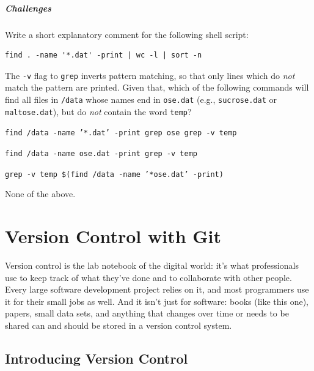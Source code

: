 \documentclass{book}
\begin{document}
\mbox{}\paragraph{Challenges}

\begin{swcenumerate}
\item
  Write a short explanatory comment for the following shell script:

\begin{verbatim}
find . -name '*.dat' -print | wc -l | sort -n
\end{verbatim}
\item
  The \texttt{-v} flag to \texttt{grep} inverts pattern matching, so
  that only lines which do \emph{not} match the pattern are printed.
  Given that, which of the following commands will find all files in
  \texttt{/data} whose names end in \texttt{ose.dat} (e.g.,
  \texttt{sucrose.dat} or \texttt{maltose.dat}), but do \emph{not}
  contain the word \texttt{temp}?

  \begin{swcenumerate2}
  \item
    \texttt{find /data -name '*.dat' -print \textbar{} grep ose \textbar{} grep -v temp}
  \item
    \texttt{find /data -name ose.dat -print \textbar{} grep -v temp}
  \item
    \texttt{grep -v temp \$(find /data -name '*ose.dat' -print)}
  \item
    None of the above.
  \end{swcenumerate2}
\end{swcenumerate}

\chapter{Version Control with Git}\label{s:git}

Version control is the lab notebook of the digital world: it's what
professionals use to keep track of what they've done and to collaborate
with other people. Every large software development project relies on
it, and most programmers use it for their small jobs as well. And it
isn't just for software: books (like this one), papers, small data sets,
and anything that changes over time or needs to be shared can and should
be stored in a version control system.

\section{Introducing Version Control}
\end{document}
